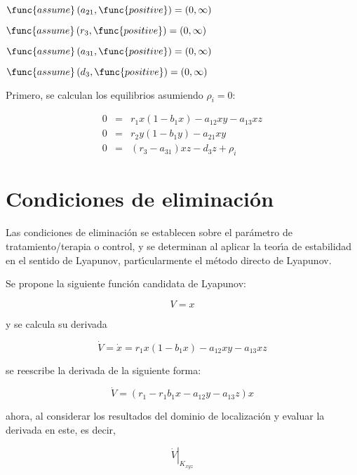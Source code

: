 \documentclass[letterpaper,11pt]{article}
\begin{document}
$\func{assume}\left( a_{21},\func{positive}\right) =\allowbreak \left(
0,\infty \right) $

$\func{assume}\left( r_{3},\func{positive}\right) =\allowbreak \left(
0,\infty \right) $

$\func{assume}\left( a_{31},\func{positive}\right) =\allowbreak \left(
0,\infty \right) $

$\func{assume}\left( d_{3},\func{positive}\right) =\allowbreak \left(
0,\infty \right) $

Primero, se calculan los equilibrios asumiendo $\rho _{i}=0$:

\begin{eqnarray*}
0 &=&r_{1}x\left( 1-b_{1}x\right) -a_{12}xy-a_{13}xz \\
0 &=&r_{2}y\left( 1-b_{1}y\right) -a_{21}xy \\
0 &=&(r_{3}-a_{31})xz-d_{3}z+\rho _{i}
\end{eqnarray*}

\section{Condiciones de eliminaci\'{o}n}

Las condiciones de eliminaci\'{o}n se establecen sobre el par\'{a}metro de
tratamiento/terapia o control, y se determinan al aplicar la teor\'{\i}a de
estabilidad en el sentido de Lyapunov, part\'{\i}cularmente el m\'{e}todo
directo de Lyapunov.

Se propone la siguiente funci\'{o}n candidata de Lyapunov:

\begin{equation*}
V=x
\end{equation*}

y se calcula su derivada

\begin{equation*}
\dot{V}=\dot{x}=r_{1}x\left( 1-b_{1}x\right) -a_{12}xy-a_{13}xz
\end{equation*}

se reescribe la derivada de la siguiente forma:

\begin{equation*}
\dot{V}=\left( r_{1}-r_{1}b_{1}x-a_{12}y-a_{13}z\right) x
\end{equation*}

ahora, al considerar los resultados del dominio de localizaci\'{o}n y
evaluar la derivada en este, es decir,

\begin{equation*}
\left. \dot{V}\right\vert _{K_{xyz}}
\end{equation*}
\end{document}
